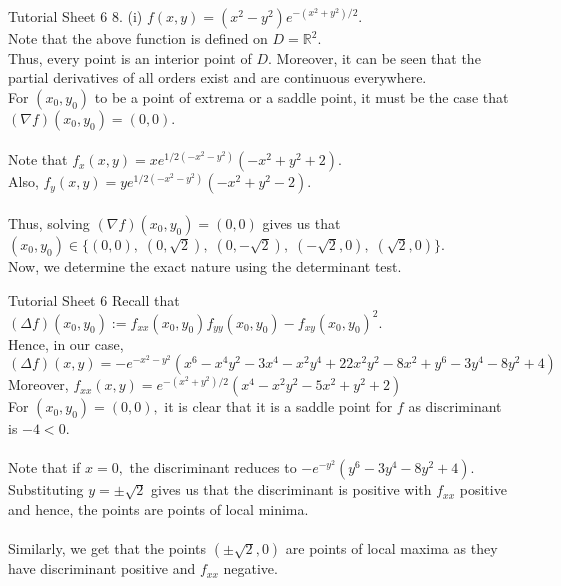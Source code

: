 \documentclass[aspectratio=169]{beamer}
\begin{document}
\begin{frame}{Tutorial Sheet 6}
	8. (i) $f(x, y)=\left(x^{2}-y^{2}\right) e^{-\left(x^{2}+y^{2}\right) / 2}.$ \\
	Note that the above function is defined on $D = \mathbb{R}^2.$ \\
	Thus, every point is an interior point of $D.$ Moreover, it can be seen that the partial derivatives of all orders exist and are continuous everywhere. \\
	For $(x_0, y_0)$ to be a point of extrema or a saddle point, it must be the case that $(\nabla f)(x_0, y_0) = (0, 0).$ \\~\\
	Note that $f_x(x, y) =x e^{1 / 2\left(-x^{2}-y^{2}\right)}\left(-x^{2}+y^{2}+2\right).$ \\
	Also, $f_y(x, y) =y e^{1 / 2\left(-x^{2}-y^{2}\right)}\left(-x^{2}+y^{2}-2\right).$ \\~\\
	Thus, solving $(\nabla f)(x_0, y_0) = (0, 0)$ gives us that $(x_0, y_0) \in \{(0, 0),\;(0, \sqrt{2}),\;(0, -\sqrt{2}),\;(-\sqrt{2},0),\;(\sqrt{2}, 0)\}.$ \\
	Now, we determine the exact nature using the determinant test.
\end{frame}

\begin{frame}{Tutorial Sheet 6}
	Recall that $(\Delta f)\left(x_{0}, y_{0}\right):=f_{x x}\left(x_{0}, y_{0}\right) f_{y y}\left(x_{0}, y_{0}\right)-f_{x y}\left(x_{0}, y_{0}\right)^{2}.$ \\
	Hence, in our case,
	\begin{equation*}
	    (\Delta f)(x, y) = -e^{-x^{2}-y^{2}} \left(x^{6}-x^{4} y^{2}-3 x^{4}-x^{2} y^{4}+22 x^{2} y^{2}-8 x^{2}+y^{6}-3 y^{4}-8 y^{2}+4\right)
	\end{equation*}
	Moreover, $f_{xx}(x, y) = e^{-\left(x^{2}+y^{2}\right) / 2}(x^4 - x^2y^2 - 5x^2 + y^2 + 2)$ \\
	For $(x_0, y_0) = (0, 0),$ it is clear that it is a saddle point for $f$ as discriminant is $-4 < 0.$ \\~\\
	Note that if $x = 0,$ the discriminant reduces to $-e^{-y^2}(y^6 - 3y^4 -8y^2 + 4).$ \\
	Substituting $y = \pm\sqrt{2}$ gives us that the discriminant is positive with $f_{xx}$ positive and hence, the points are points of local minima. \\~\\
	Similarly, we get that the points $(\pm\sqrt{2}, 0)$ are points of local maxima as they have discriminant positive and $f_{xx}$ negative. 
\end{frame}
\end{document}
